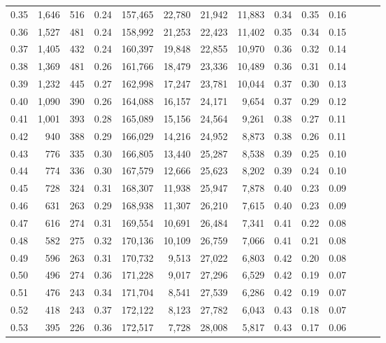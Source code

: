 \begin{tabular}{rrrrrrrrrrrrrr}
0.35 &  1,646 &  516 &  0.24 &  157,465 &   22,780 &  21,942 &  11,883 &  0.34 &  0.35 &      0.16 \\
0.36 &  1,527 &  481 &  0.24 &  158,992 &   21,253 &  22,423 &  11,402 &  0.35 &  0.34 &      0.15 \\
0.37 &  1,405 &  432 &  0.24 &  160,397 &   19,848 &  22,855 &  10,970 &  0.36 &  0.32 &      0.14 \\
0.38 &  1,369 &  481 &  0.26 &  161,766 &   18,479 &  23,336 &  10,489 &  0.36 &  0.31 &      0.14 \\
0.39 &  1,232 &  445 &  0.27 &  162,998 &   17,247 &  23,781 &  10,044 &  0.37 &  0.30 &      0.13 \\
0.40 &  1,090 &  390 &  0.26 &  164,088 &   16,157 &  24,171 &   9,654 &  0.37 &  0.29 &      0.12 \\
0.41 &  1,001 &  393 &  0.28 &  165,089 &   15,156 &  24,564 &   9,261 &  0.38 &  0.27 &      0.11 \\
0.42 &    940 &  388 &  0.29 &  166,029 &   14,216 &  24,952 &   8,873 &  0.38 &  0.26 &      0.11 \\
0.43 &    776 &  335 &  0.30 &  166,805 &   13,440 &  25,287 &   8,538 &  0.39 &  0.25 &      0.10 \\
0.44 &    774 &  336 &  0.30 &  167,579 &   12,666 &  25,623 &   8,202 &  0.39 &  0.24 &      0.10 \\
0.45 &    728 &  324 &  0.31 &  168,307 &   11,938 &  25,947 &   7,878 &  0.40 &  0.23 &      0.09 \\
0.46 &    631 &  263 &  0.29 &  168,938 &   11,307 &  26,210 &   7,615 &  0.40 &  0.23 &      0.09 \\
0.47 &    616 &  274 &  0.31 &  169,554 &   10,691 &  26,484 &   7,341 &  0.41 &  0.22 &      0.08 \\
0.48 &    582 &  275 &  0.32 &  170,136 &   10,109 &  26,759 &   7,066 &  0.41 &  0.21 &      0.08 \\
0.49 &    596 &  263 &  0.31 &  170,732 &    9,513 &  27,022 &   6,803 &  0.42 &  0.20 &      0.08 \\
0.50 &    496 &  274 &  0.36 &  171,228 &    9,017 &  27,296 &   6,529 &  0.42 &  0.19 &      0.07 \\
0.51 &    476 &  243 &  0.34 &  171,704 &    8,541 &  27,539 &   6,286 &  0.42 &  0.19 &      0.07 \\
0.52 &    418 &  243 &  0.37 &  172,122 &    8,123 &  27,782 &   6,043 &  0.43 &  0.18 &      0.07 \\
0.53 &    395 &  226 &  0.36 &  172,517 &    7,728 &  28,008 &   5,817 &  0.43 &  0.17 &      0.06 \\

\end{tabular}
